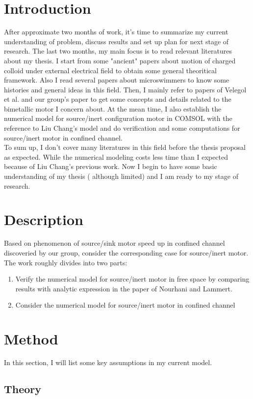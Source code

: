 \documentclass[fontsize=11pt, %
                             paper=a4, %
                             twoside, %
                             captions=tableheading,
                             index=totoc,
                             hyperref]{labbook}
\begin{document}
\begin{addmargin}[4cm]{0cm}
\section*{Introduction}
After approximate two months of work, it's time to summarize my current understanding of problem, discuss results and set up plan for next stage of research. The last two months, my main focus is to read relevant literatures about my thesis. I start from some "ancient" papers about motion of charged colloid under external electrical field to obtain some general theoritical framework. Also I read several papers about microswimmers to know some histories and general ideas in this field. Then, I mainly refer to papers of Velegol et al. and our group's paper to get some concepts and details related to the bimetallic motor I concern about. At the mean time, I also establish the numerical model for source/inert configuration motor in COMSOL with the reference to Liu Chang's model and do verification and some computations for source/inert motor in confined channel.\\
To sum up, I don't cover many literatures in this field before the thesis proposal as expected. While the numerical modeling costs less time than I expected because of Liu Chang's previous work. Now I begin to have some basic understanding of my thesis ( although limited) and I am ready to my stage of research.
\section*{Description}
Based on phenomenon of source/sink motor speed up in confined channel discoveried by our group\cite{Liu2016}, consider the corresponding case for source/inert motor. The work roughly divides into two parts:
\begin{enumerate}
\item
Verify the numerical model for source/inert motor in free space by comparing results with analytic expression in the paper of Nourhani and Lammert\cite{Nourhani2016}.
\item
Consider the numerical model for source/inert motor in confined channel
\end{enumerate}
\section*{Method}
In this section, I will list some key assumptions in my current model.
\subsection*{Theory}

\end{addmargin}
\end{document}

